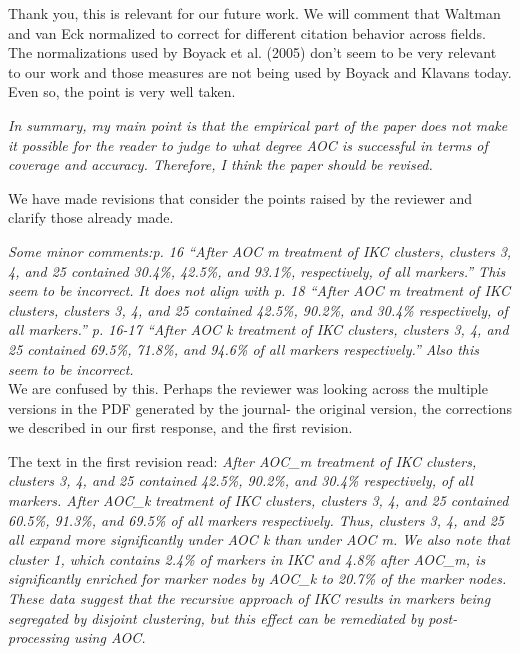 \documentclass[11pt, oneside]{article}   	%
\begin{document}
 \vspace{2 mm} 
 Thank you, this is relevant for our future work. We will comment that Waltman and van Eck normalized to correct for different citation behavior across fields. The normalizations used by Boyack et al. (2005) don't seem to be very relevant to our work and those measures are not being used by Boyack and Klavans today. Even so, the point is very well taken. 

\vspace{2 mm} 
 \emph{In summary, my main point is that the empirical part of the paper does not make it possible for the reader to judge to what degree AOC is successful in terms of coverage and accuracy. Therefore, I think the paper should be revised.}  
 
 \vspace{2 mm} 
 We have made revisions that consider the points raised by the reviewer and clarify those already made.

\vspace{2 mm} 
 \emph{Some minor comments:p. 16 “After AOC m treatment of IKC clusters, clusters 3, 4, and 25 contained 30.4\%, 42.5\%, and 93.1\%, respectively, of all markers.” This seem to be incorrect. It does not align with p. 18 “After AOC m treatment of IKC clusters, clusters 3, 4, and 25 contained 42.5\%, 90.2\%, and 30.4\% respectively, of all markers.” p. 16-17 “After AOC k treatment of IKC clusters, clusters 3, 4, and 25 contained 69.5\%, 71.8\%, and 94.6\% of all markers respectively.” Also this seem to be incorrect.} \\

We are confused by this. Perhaps the reviewer was looking across the multiple versions in the PDF generated by the journal- the original version, the corrections we described in our first response, and the first revision. 

\vspace{2 mm} 
The text in the first revision read: \emph{After AOC\_m treatment of IKC clusters, clusters 3, 4, and 25 contained 42.5\%, 90.2\%, and 30.4\% respectively, of all markers. After AOC\_k treatment of IKC clusters, clusters 3, 4, and 25 contained 60.5\%, 91.3\%, and 69.5\% of all markers respectively. Thus, clusters 3, 4, and 25 all expand more significantly under AOC k than under AOC m. We also note that cluster 1, which contains 2.4\% of markers in IKC and 4.8\% after AOC\_m, is significantly enriched for marker nodes by AOC\_k to 20.7\% of the marker nodes. These data suggest that the recursive approach of IKC results in markers being segregated by disjoint clustering, but this effect can be remediated by post-processing using AOC.}
\end{document}
